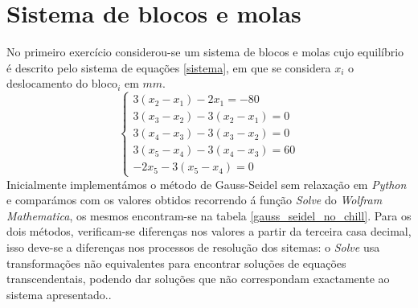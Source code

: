 \documentclass[aps,pre,twocolumn,showpacs,amsmath,amssymb]{revtex4-1}
\begin{document}
\section{Sistema de blocos e molas}

No primeiro exercício considerou-se um sistema de blocos e molas cujo equilíbrio é descrito pelo sistema de equações \ref{sistema}, em que se considera $x_i$ o deslocamento do bloco$_i$ em $mm$.
\begin{equation}
\begin{cases}
3(x_2-x_1)-2x_1=-80\\
3(x_3-x_2)-3(x_2-x_1)=0\\
3(x_4-x_3)-3(x_3-x_2)=0\\
3(x_5-x_4)-3(x_4-x_3)=60\\
-2x_5-3(x_5-x_4)=0
\end{cases}
\label{sistema}
\end{equation}
Inicialmente implementámos o método de Gauss-Seidel sem relaxação em {\it Python} e comparámos com os valores obtidos recorrendo á função {\it Solve} do {\it Wolfram Mathematica}, os mesmos encontram-se na tabela \ref{gauss_seidel_no_chill}. Para os dois métodos, verificam-se diferenças nos valores a partir da terceira casa decimal, isso deve-se a diferenças nos processos de resolução dos sitemas: o \textit{Solve} usa transformações não equivalentes para encontrar soluções de equações transcendentais, podendo dar soluções que não correspondam exactamente ao sistema apresentado..
\begin{table}[h!]
\centering
\caption{Valores das variáveis $x_i$ obtidos com o {\it Wolfram Mathematica} e implementando o método de Gauss-Seidel sem relaxação usando como critério de convergência $\varepsilon =0,0001$ e um máximo de 50 iterações. Ao correr, os valores convergiram ao fim de 39 iterações e obtivemos $x_i$ com uma precisão de 4 casas decimais.}
\label{gauss_seidel_no_chill}
\end{table}\\
\end{document}
